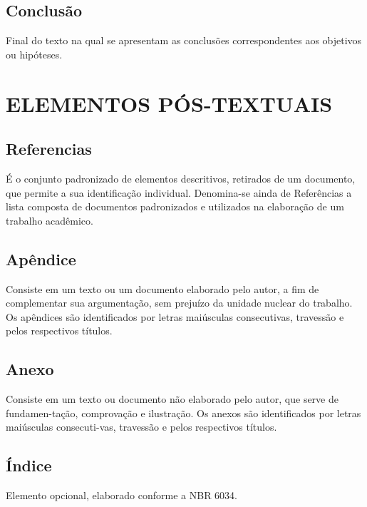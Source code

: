 \subsection{Conclusão}

Final do texto na qual se apresentam as conclusões correspondentes aos objetivos ou hipóteses.

\section{ELEMENTOS PÓS-TEXTUAIS}

\subsection{Referencias}

É o conjunto padronizado de elementos descritivos, retirados de
um documento, que permite a sua identificação individual. Denomina-se ainda de Referências a lista composta de documentos padronizados e utilizados na elaboração de um trabalho acadêmico.

\subsection{Apêndice}

Consiste em um texto ou um documento elaborado pelo autor, a fim
de complementar sua argumentação, sem prejuízo da unidade nuclear do trabalho. Os apêndices são identificados por letras maiúsculas consecutivas, travessão e pelos respectivos títulos.

\subsection{Anexo}

Consiste em um texto ou documento não elaborado pelo autor, que
serve de fundamen-tação, comprovação e ilustração. Os anexos são identificados por letras maiúsculas consecuti-vas, travessão e pelos respectivos títulos.

\subsection{Índice}

Elemento opcional, elaborado conforme a NBR 6034.

